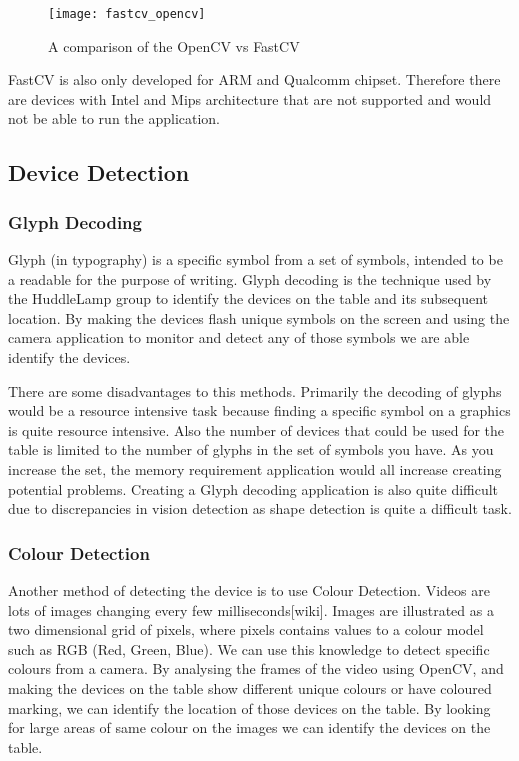\begin{figure}[h]
    \centering
    \texttt{[image: fastcv\_opencv]}
    \caption{A comparison of the OpenCV vs FastCV \cite{fastcv_opencv}}
    \label{opencv_fastcv}
\end{figure}

FastCV is also only developed for ARM and Qualcomm chipset. Therefore there are devices with Intel and Mips architecture that are not supported and would not be able to run the application.

\subsection{Device Detection}

\subsubsection{Glyph Decoding}
Glyph (in typography) is a specific symbol from a set of symbols, intended to be a readable for the purpose of writing\cite{glyph-wiki}. Glyph decoding is the technique used by the HuddleLamp group to identify the devices on the table and its subsequent location\cite{huddlelamp-paper}. By making the devices flash unique symbols on the screen and using the camera application to monitor and detect any of those symbols we are able identify the devices. 

There are some disadvantages to this methods. Primarily the decoding of glyphs would be a resource intensive task because finding a specific symbol on a graphics is quite resource intensive. Also the number of devices that could be used for the table is limited to the number of glyphs in the set of symbols you have. As you increase the set, the memory requirement application would all increase creating potential problems. Creating a Glyph decoding application is also quite difficult due to discrepancies in vision detection as shape detection is quite a difficult task\cite{shape_recognition}.
\subsubsection{Colour Detection}
Another method of detecting the device is to use Colour Detection. Videos are lots of images changing every few milliseconds[wiki]. Images are illustrated as a two dimensional grid of pixels, where pixels contains values to a colour model such as RGB (Red, Green, Blue). We can use this knowledge to detect specific colours from a camera.
By analysing the frames of the video using OpenCV, and making the devices on the table show different unique colours or have coloured marking, we can identify the location of those devices on the table. By looking for large areas of same colour on the images we can identify the devices on the table.


